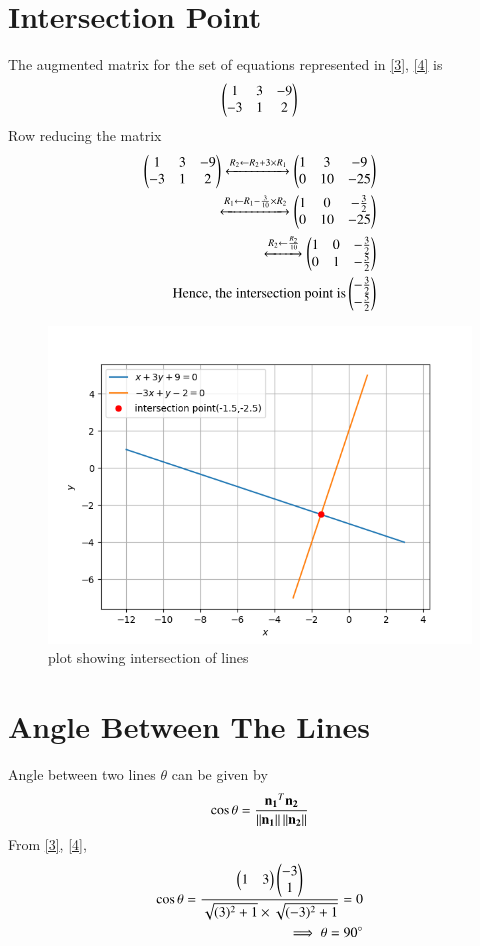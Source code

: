 \documentclass[journal,12pt,twocolumn]{IEEEtran}
\begin{document}
\section{Intersection Point}
The augmented matrix for the set of equations represented in \eqref{3}, \eqref{4} is
\begin{align}
\begin{pmatrix}1&3&-9\\-3&1&2\end{pmatrix}
\end{align}
Row reducing the matrix
\begin{align}
 \begin{pmatrix}1&3&-9\\-3&1&2\end{pmatrix}\xleftrightarrow[]{R_2\leftarrow R_2+3\times R_1}\begin{pmatrix}1&3&-9\\0&10&-25\end{pmatrix}\\
 \xleftrightarrow[]{R_1\leftarrow R_1-\frac{3}{10}\times R_2}\begin{pmatrix}1&0&-\frac{3}{2}\\0&10&-25\end{pmatrix}\\
 \xleftrightarrow[]{R_2\leftarrow \frac{R_2}{10}}\begin{pmatrix}1&0&-\frac{3}{2}\\0&1&-\frac{5}{2}\end{pmatrix}\\
\text{Hence, the intersection point is}
\begin{pmatrix}-\frac{3}{2}\\-\frac{5}{2}\end{pmatrix}
\end{align}
\begin{figure}[!ht]
\centering
\includegraphics[width=\columnwidth]{hw4plot.png}
\caption{plot showing intersection of lines}
\label{Fig}
\end{figure}
\newpage
\section{Angle Between The Lines}
Angle between two lines $\theta$ can be given by
\begin{align}
\cos \theta = \frac{\mathbf{n_1}^T\mathbf{n_2}}{\left\lVert\mathbf{n_1}\right\rVert\left\lVert\mathbf{n_2}\right\rVert}
\end{align}
From \eqref{3}, \eqref{4},
\begin{align}
\cos \theta=\frac{\begin{pmatrix}1&3\end{pmatrix}\begin{pmatrix}-3\\1\end{pmatrix}}{\sqrt{(3)^2 +1} \times \sqrt{(-3)^2 +1}}=0\\
\implies \theta = 90\degree
\end{align}
\end{document}
